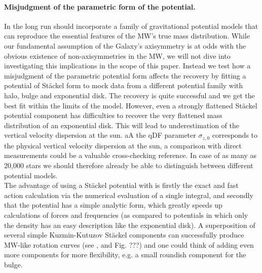 \paragraph{Misjudgment of the parametric form of the potential.} In the long run \RM should incorporate a family of gravitational potential models that can reproduce the essential features of the MW's true mass distribution. While our fundamental assumption of the Galaxy's axisymmetry is at odds with the obvious existence of non-axisymmetries in the MW, we will not dive into investigating this implications in the scope of this paper. Instead we test how a misjudgment of the parametric potential form affects the recovery by fitting a potential of St\"{a}ckel form \citep{bat94} to mock data from a different potential family with halo, bulge and exponential disk. The recovery is quite successful and we get the best fit within the limits of the model. However, even a strongly flattened St\"{a}ckel potential component has difficulties to recover the very flattened mass distribution of an exponential disk. This will lead to underestimation of the vertical velocity dispersion at the sun. aA the qDF parameter $\sigma_{z,0}$ corresponds to the physical vertical velocity dispersion at the sun, a comparison with direct measurements could be a valuable cross-checking reference. In case of as many as 20,000 stars we should therefore already be able to distinguish between different potential models.
\\The advantage of using a St\"{a}ckel potential with \RM is firstly the exact and fast action calculation via the numerical evaluation of a single integral, and secondly that the potential has a simple analytic form, which greatly speeds up calculations of forces and frequencies (as compared to potentials in which only the density has an easy description like the exponential disk). A superposition of several simple Kuzmin-Kutuzov St\"{a}ckel components can successfully produce MW-like rotation curves (see \citet{bat94}, \citet{fam03} and Fig. ???) and one could think of adding even more components for more flexibility, e.g. a small roundish component for the bulge.

